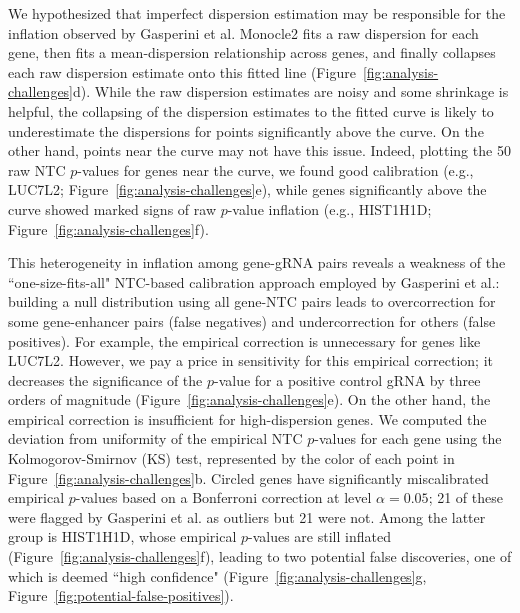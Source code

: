 \documentclass{nature}
\begin{document}
We hypothesized that imperfect dispersion estimation may be responsible for the inflation observed by Gasperini et al. Monocle2 fits a raw dispersion for each gene, then fits a mean-dispersion relationship across genes, and finally collapses each raw dispersion estimate onto this fitted line (Figure~\ref{fig:analysis-challenges}d). While the raw dispersion estimates are noisy and some shrinkage is helpful\cite{Hafemeister2019}, the collapsing of the dispersion estimates to the fitted curve is likely to underestimate the dispersions for points significantly above the curve. On the other hand, points near the curve may not have this issue. Indeed, plotting the 50 raw NTC $p$-values for genes near the curve, we found good calibration (e.g., LUC7L2; Figure~\ref{fig:analysis-challenges}e), while genes significantly above the curve showed marked signs of raw $p$-value inflation (e.g., HIST1H1D; Figure~\ref{fig:analysis-challenges}f). 

This heterogeneity in inflation among gene-gRNA pairs reveals a weakness of the ``one-size-fits-all" NTC-based calibration approach employed by Gasperini et al.: building a null distribution using all gene-NTC pairs leads to overcorrection for some gene-enhancer pairs (false negatives) and undercorrection for others (false positives). For example, the empirical correction is unnecessary for genes like LUC7L2. However, we pay a price in sensitivity for this empirical correction; it decreases the significance of the $p$-value for a positive control gRNA by three orders of magnitude (Figure~\ref{fig:analysis-challenges}e). On the other hand, the empirical correction is insufficient for high-dispersion genes. We computed the deviation from uniformity of the empirical NTC $p$-values for each gene using the Kolmogorov-Smirnov (KS) test, represented by the color of each point in Figure~\ref{fig:analysis-challenges}b. Circled genes have significantly miscalibrated empirical $p$-values based on a Bonferroni correction at level $\alpha = 0.05$; 21 of these were flagged by Gasperini et al. as outliers but 21 were not. Among the latter group is HIST1H1D, whose empirical $p$-values are still inflated (Figure~\ref{fig:analysis-challenges}f), leading to two potential false discoveries, one of which is deemed ``high confidence" (Figure~\ref{fig:analysis-challenges}g, Figure~\ref{fig:potential-false-positives}).

\clearpage
\end{document}
